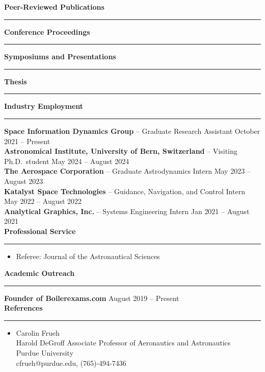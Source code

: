 \documentclass[10pt, a4paper]{article}
\newcommand{\sectiontitle}[1]{{\Large \textbf{#1}}\vspace{0.5em}\hrule\vspace{0.5em}}
\begin{document}
\nocite{*}
\sectiontitle{Peer-Reviewed Publications}
\printbibliography[heading=none, keyword={journal}, resetnumbers=true]

\nocite{*}
\sectiontitle{Conference Proceedings}
\printbibliography[heading=none, keyword={conference}, resetnumbers=true]

\nocite{*}
\sectiontitle{Symposiums and Presentations}
\printbibliography[heading=none, keyword={presentations}, resetnumbers=true]

\nocite{*}
\sectiontitle{Thesis}
\printbibliography[heading=none, keyword={thesis}, resetnumbers=true]



\sectiontitle{Industry Employment}
\textbf{Space Information Dynamics Group} -- Graduate Research Assistant \hfill October 2021 -- Present \\
\textbf{Astronomical Institute, University of Bern, Switzerland} -- Visiting Ph.D.\ student \hfill May 2024 -- August 2024 \\
\textbf{The Aerospace Corporation} -- Graduate Astrodynamics Intern \hfill May 2023 -- August 2023 \\
\textbf{Katalyst Space Technologies} -- Guidance, Navigation, and Control Intern \hfill May 2022 -- August 2022 \\
\textbf{Analytical Graphics, Inc.} -- Systems Engineering Intern \hfill Jan 2021 -- August 2021 \\

\sectiontitle{Professional Service}

\begin{itemize}[noitemsep]
  \item Referee: Journal of the Astronautical Sciences
\end{itemize}

\sectiontitle{Academic Outreach}
\textbf{Founder of Boilerexams.com} \hfill August 2019 -- Present \\

\sectiontitle{References}

\begin{itemize}
  \item Carolin Frueh \\
Harold DeGroff Associate Professor of Aeronautics and Astronautics \\
Purdue University \\
cfrueh@purdue.edu, (765)-494-7436 \\
\end{itemize}
\end{document}
